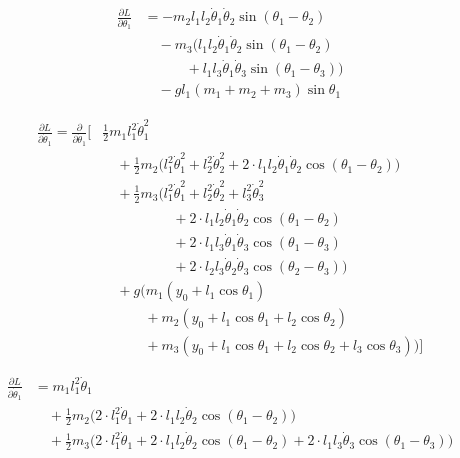\documentclass[11pt,a4paper]{article}
\begin{document}
\begin{align*}
    \frac{\partial L}{\partial \theta_1} &= -m_2 l_1 l_2 \dot{\theta}_1 \dot{\theta}_2 \sin(\theta_1 - \theta_2) \\
    &\quad - m_3 \big( l_1 l_2 \dot{\theta}_1 \dot{\theta}_2 \sin(\theta_1 - \theta_2) \\
        &\qquad\quad + l_1 l_3 \dot{\theta}_1 \dot{\theta}_3 \sin(\theta_1 - \theta_3) \big) \\
    &\quad - g l_1 (m_1 + m_2 + m_3) \sin\theta_1
\end{align*}

\begin{align*}
    \frac{\partial L}{\partial \dot\theta_1} = \frac{\partial}{\partial \dot\theta_1} \Biggl[
    &\frac{1}{2} m_1 l_1^2 \dot{\theta}_1^2 \\
    &\quad + \frac{1}{2} m_2 \big( l_1^2 \dot{\theta}_1^2 + l_2^2 \dot{\theta}_2^2 + 2 \cdot l_1 l_2 \dot{\theta}_1 \dot{\theta}_2 \cos(\theta_1 - \theta_2) \big) \\
    &\quad + \frac{1}{2} m_3 \big( l_1^2 \dot{\theta}_1^2 + l_2^2 \dot{\theta}_2^2 + l_3^2 \dot{\theta}_3^2 \\
        &\qquad\qquad\quad + 2 \cdot l_1 l_2 \dot{\theta}_1 \dot{\theta}_2 \cos(\theta_1 - \theta_2) \\
        &\qquad\qquad\quad + 2 \cdot l_1 l_3 \dot{\theta}_1 \dot{\theta}_3 \cos(\theta_1 - \theta_3) \\
        &\qquad\qquad\quad + 2 \cdot l_2 l_3 \dot{\theta}_2 \dot{\theta}_3 \cos(\theta_2 - \theta_3) \big) \\
    &\quad + g \big( m_1 (y_0 + l_1 \cos\theta_1) \\
        &\qquad\quad + m_2 (y_0 + l_1 \cos\theta_1 + l_2 \cos\theta_2) \\
        &\qquad\quad + m_3 (y_0 + l_1 \cos\theta_1 + l_2 \cos\theta_2 + l_3 \cos\theta_3) \big) \Biggr]
\end{align*}

\begin{align*}
    \frac{\partial L}{\partial \dot\theta_1} &= m_1 l_1^2 \dot{\theta}_1 \\
    &\quad + \frac{1}{2} m_2 \big( 2 \cdot l_1^2 \dot{\theta}_1 + 2 \cdot l_1 l_2 \dot{\theta}_2 \cos(\theta_1 - \theta_2) \big) \\
    &\quad + \frac{1}{2} m_3 \big( 2 \cdot l_1^2 \dot{\theta}_1 + 2 \cdot l_1 l_2 \dot{\theta}_2 \cos(\theta_1 - \theta_2) + 2 \cdot l_1 l_3 \dot{\theta}_3 \cos(\theta_1 - \theta_3) \big) \\
\end{align*}
\end{document}

